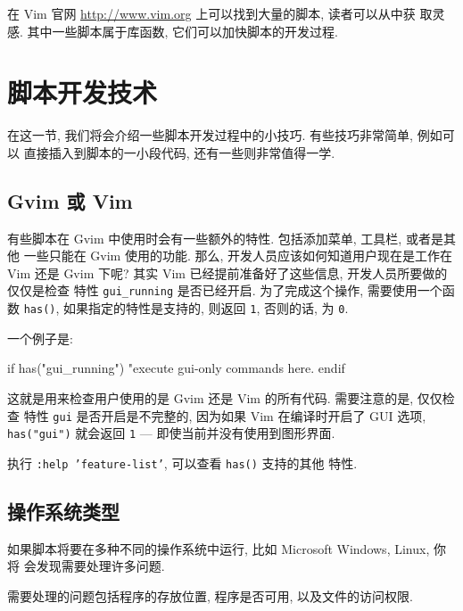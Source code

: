 \begin{warning}
	在 Vim 官网 \url{http://www.vim.org} 上可以找到大量的脚本, 读者可以从中获
	取灵感. 其中一些脚本属于库函数, 它们可以加快脚本的开发过程.
\end{warning}

\section{脚本开发技术}
\label{sec:scripting_tips}

在这一节, 我们将会介绍一些脚本开发过程中的小技巧. 有些技巧非常简单, 例如可以
直接插入到脚本的一小段代码, 还有一些则非常值得一学.

\subsection{Gvim 或 Vim}
\label{subsec:gvim_vim}

有些脚本在 Gvim 中使用时会有一些额外的特性. 包括添加菜单, 工具栏, 或者是其他
一些只能在 Gvim 使用的功能. 那么, 开发人员应该如何知道用户现在是工作在 Vim
还是 Gvim 下呢? 其实 Vim 已经提前准备好了这些信息, 开发人员所要做的仅仅是检查
特性 \texttt{gui\_running} 是否已经开启. 为了完成这个操作, 需要使用一个函数
\texttt{has()}, 如果指定的特性是支持的, 则返回 \texttt{1}, 否则的话, 为
\texttt{0}.

一个例子是:
\begin{vimcode}
if has("gui_running")
	"execute gui-only commands here.
endif
\end{vimcode}
这就是用来检查用户使用的是 Gvim 还是 Vim 的所有代码. 需要注意的是, 仅仅检查
特性 \texttt{gui} 是否开启是不完整的, 因为如果 Vim 在编译时开启了 GUI 选项,
\texttt{has("gui")} 就会返回 \texttt{1} --- 即使当前并没有使用到图形界面.

\begin{warning}
	执行 \texttt{:help 'feature-list'}, 可以查看 \texttt{has()} 支持的其他
	特性.
\end{warning}

\subsection{操作系统类型}
\label{subsec:which_operating_system}

如果脚本将要在多种不同的操作系统中运行, 比如 Microsoft Windows, Linux, 你将
会发现需要处理许多问题.

需要处理的问题包括程序的存放位置, 程序是否可用, 以及文件的访问权限.


